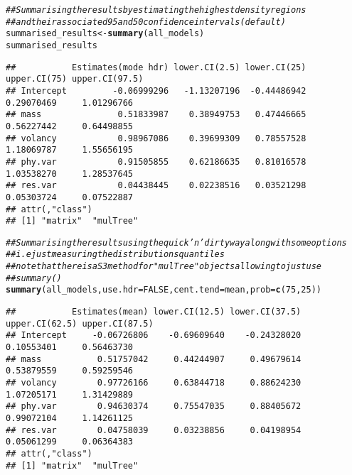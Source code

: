 \documentclass{article}\usepackage[]{graphicx}\usepackage[]{color}
\makeatletter
\newcommand{\hlnum}[1]{\textcolor[rgb]{0.686,0.059,0.569}{#1}}%
\newcommand{\hlcom}[1]{\textcolor[rgb]{0.678,0.584,0.686}{\textit{#1}}}%
\newcommand{\hlstd}[1]{\textcolor[rgb]{0.345,0.345,0.345}{#1}}%
\newcommand{\hlkwb}[1]{\textcolor[rgb]{0.69,0.353,0.396}{#1}}%
\newcommand{\hlkwc}[1]{\textcolor[rgb]{0.333,0.667,0.333}{#1}}%
\newcommand{\hlkwd}[1]{\textcolor[rgb]{0.737,0.353,0.396}{\textbf{#1}}}%
\newenvironment{kframe}{%
 \def\at@end@of@kframe{}%
 \ifinner\ifhmode%
  \def\at@end@of@kframe{\end{minipage}}%
  \begin{minipage}{\columnwidth}%
 \fi\fi%
 \def\FrameCommand##1{\hskip\@totalleftmargin \hskip-\fboxsep
 \colorbox{shadecolor}{##1}\hskip-\fboxsep
     \hskip-\linewidth \hskip-\@totalleftmargin \hskip\columnwidth}%
 \MakeFramed {\advance\hsize-\width
   \@totalleftmargin\z@ \linewidth\hsize
   \@setminipage}}%
 {\par\unskip\endMakeFramed%
 \at@end@of@kframe}
\newenvironment{knitrout}{}{} %
\makeatother
\begin{document}
\begin{knitrout}
\color{fgcolor}\begin{kframe}
\begin{alltt}
\hlcom{## Summarising the results by estimating the highest density regions}
\hlcom{## and their associated 95 and 50 confidence intervals (default)}
\hlstd{summarised_results} \hlkwb{<-} \hlkwd{summary}\hlstd{(all_models)}
\hlstd{summarised_results}
\end{alltt}
\begin{verbatim}
##           Estimates(mode hdr) lower.CI(2.5) lower.CI(25) upper.CI(75) upper.CI(97.5)
## Intercept         -0.06999296   -1.13207196  -0.44486942   0.29070469     1.01296766
## mass               0.51833987    0.38949753   0.47446665   0.56227442     0.64498855
## volancy            0.98967086    0.39699309   0.78557528   1.18069787     1.55656195
## phy.var            0.91505855    0.62186635   0.81016578   1.03538270     1.28537645
## res.var            0.04438445    0.02238516   0.03521298   0.05303724     0.07522887
## attr(,"class")
## [1] "matrix"  "mulTree"
\end{verbatim}
\begin{alltt}
\hlcom{## Summarising the results using the quick 'n' dirty way along with some options}
\hlcom{## i.e just measuring the distributions quantiles}
\hlcom{## note that there is a S3 method for "mulTree" objects allowing to just use}
\hlcom{## summary()}
\hlkwd{summary}\hlstd{(all_models,} \hlkwc{use.hdr} \hlstd{=} \hlnum{FALSE}\hlstd{,} \hlkwc{cent.tend} \hlstd{= mean,} \hlkwc{prob} \hlstd{=} \hlkwd{c}\hlstd{(}\hlnum{75}\hlstd{,} \hlnum{25}\hlstd{))}
\end{alltt}
\begin{verbatim}
##           Estimates(mean) lower.CI(12.5) lower.CI(37.5) upper.CI(62.5) upper.CI(87.5)
## Intercept     -0.06726806    -0.69609640    -0.24328020     0.10553401     0.56463730
## mass           0.51757042     0.44244907     0.49679614     0.53879559     0.59259546
## volancy        0.97726166     0.63844718     0.88624230     1.07205171     1.31429889
## phy.var        0.94630374     0.75547035     0.88405672     0.99072104     1.14261125
## res.var        0.04758039     0.03238856     0.04198954     0.05061299     0.06364383
## attr(,"class")
## [1] "matrix"  "mulTree"
\end{verbatim}
\end{kframe}
\end{knitrout}
\end{document}
